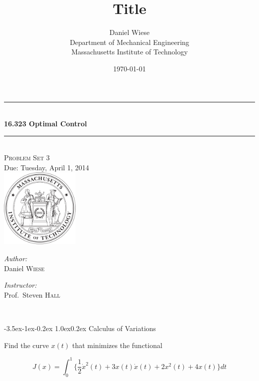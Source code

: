 \documentclass[11pt,letterpaper,onecolumn,notitlepage]{article}
\title{\textbf{Title}}
\author{Daniel Wiese \\ Department of Mechanical Engineering \\ Massachusetts Institute of Technology}
\date{\today}
\makeatletter
\renewcommand\section{\@startsection{section}{1}{\z@}%
{-3.5ex\@plus-1ex\@minus-0.2ex}%
{1.0ex\@plus0.2ex}%
{\fontsize{12pt}{12pt}\selectfont\bfseries\sffamily}}
\makeatother
\begin{document}
\begin{titlepage}
  \begin{center}
    \rule{\linewidth}{0.01in} \\[0.25in]
    {\huge\bfseries 16.323 Optimal Control}\\[0.4cm]
    \rule{\linewidth}{0.01in} \\[0.25in]

    \textsc{\LARGE Problem Set 3}\\[0.15in]
    \large Due: Tuesday, April 1, 2014 \\[1.0in]
    \includegraphics[width=1.5in]{../fig/mit-seal.pdf}\\[3.0in]

    \begin{minipage}{0.4\textwidth}
      \begin{flushleft} \large
        \emph{Author:}\\
        Daniel \textsc{Wiese}
        \vfill
      \end{flushleft}
    \end{minipage}
    \begin{minipage}{0.4\textwidth}
      \begin{flushright} \large
        \emph{Instructor:} \\
        Prof.~Steven \textsc{Hall} \\
      \end{flushright}
    \end{minipage} \\
    \vfill
  \end{center}
\end{titlepage}

\clearpage
\section{Calculus of Variations}

Find the curve $x(t)$ that minimizes the functional

\begin{equation*}
  J(x)=\int_{0}^{1}\biggr\{\frac{1}{2}\dot{x}^{2}(t)+3x(t)\dot{x}(t)+2x^{2}(t)+4x(t)\biggr\}dt
\end{equation*}
\end{document}
